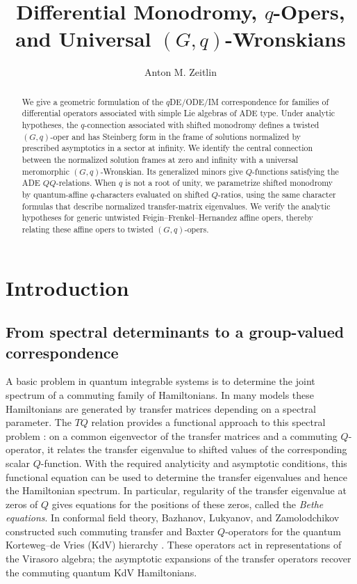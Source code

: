 \documentclass[11pt,leqno]{amsart}
\title[Differential Monodromy and $q$-Opers]{Differential Monodromy, $q$-Opers, and Universal $(G,q)$-Wronskians}
\author[A. M. Zeitlin]{Anton M. Zeitlin}
\date{}
\numberwithin{equation}{section}
\theoremstyle{plain}
\theoremstyle{definition}
\theoremstyle{plain}
\theoremstyle{definition}
\theoremstyle{remark}
\begin{document}
\begin{abstract}
We give a geometric formulation of the $q$DE/ODE/IM correspondence for families of differential operators associated with simple Lie algebras of ADE type.  Under analytic hypotheses, the $q$-connection associated with shifted monodromy defines a twisted $(G,q)$-oper and has Steinberg form in the frame of solutions normalized by prescribed asymptotics in a sector at infinity.  We identify the central connection between the normalized solution frames at zero and infinity with a universal meromorphic $(G,q)$-Wronskian.  Its generalized minors give $Q$-functions satisfying the ADE $QQ$-relations.  When $q$ is not a root of unity, we parametrize shifted monodromy by quantum-affine $q$-characters evaluated on shifted $Q$-ratios, using the same character formulas that describe normalized transfer-matrix eigenvalues.  We verify the analytic hypotheses for generic untwisted Feigin--Frenkel--Hernandez affine opers, thereby relating these affine opers to twisted $(G,q)$-opers.
\end{abstract}
\maketitle

\tableofcontents

\section{Introduction}\label{sec:introduction}

\subsection{From spectral determinants to a group-valued correspondence}\label{sec:intro-spectral-problems}

A basic problem in quantum integrable systems is to determine the joint spectrum of a commuting family of Hamiltonians.  In many models these Hamiltonians are generated by transfer matrices depending on a spectral parameter.  The $TQ$ relation provides a functional approach to this spectral problem \cite{Baxter1972}: on a common eigenvector of the transfer matrices and a commuting $Q$-operator, it relates the transfer eigenvalue to shifted values of the corresponding scalar $Q$-function.  With the required analyticity and asymptotic conditions, this functional equation can be used to determine the transfer eigenvalues and hence the Hamiltonian spectrum.  In particular, regularity of the transfer eigenvalue at zeros of $Q$ gives equations for the positions of these zeros, called the \emph{Bethe equations}.  In conformal field theory, Bazhanov, Lukyanov, and Zamolodchikov constructed such commuting transfer and Baxter $Q$-operators for the quantum Korteweg--de Vries (KdV) hierarchy \cite{BLZ1996,BLZ1997}.  These operators act in representations of the Virasoro algebra; the asymptotic expansions of the transfer operators recover the commuting quantum KdV Hamiltonians.
\end{document}
